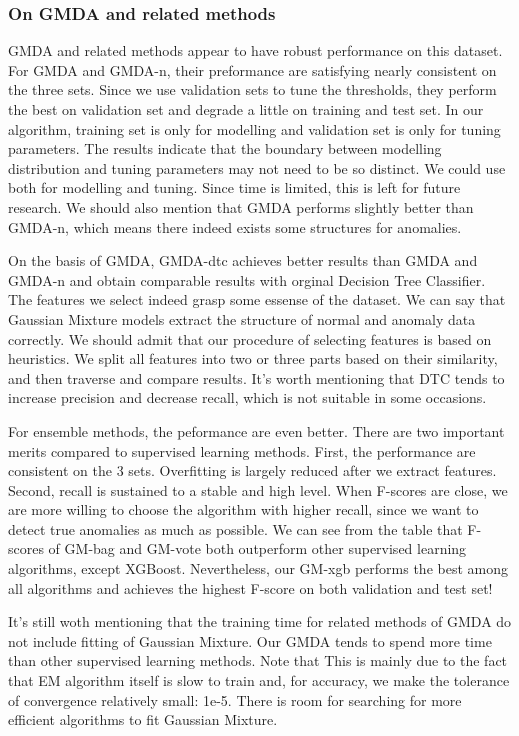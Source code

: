 \documentclass[english]{article}
\begin{document}
\subsubsection{On GMDA and related methods}
\par GMDA and related methods appear to have robust performance on this dataset. For GMDA and GMDA-n, their preformance are satisfying nearly consistent on the three sets. Since we use validation sets to tune the thresholds, they perform the best on validation set and degrade a little on training and test set. In our algorithm, training set is only for modelling and validation set is only for tuning parameters. The results indicate that the boundary between modelling distribution and tuning parameters may not need to be so distinct. We could use both for modelling and tuning. Since time is limited, this is left for future research. We should also mention that GMDA performs slightly better than GMDA-n, which means there indeed exists some structures for anomalies.
\par On the basis of GMDA, GMDA-dtc achieves better results than GMDA and GMDA-n and obtain comparable results with orginal Decision Tree Classifier. The features we select indeed grasp some essense of the dataset. We can say that Gaussian Mixture models extract the structure of normal and anomaly data correctly. We should admit that our procedure of selecting features is based on heuristics. We split all features into two or three parts based on their similarity, and then traverse and compare results. It's worth mentioning that DTC tends to increase precision and decrease recall, which is not suitable in some occasions. 
\par For ensemble methods, the peformance are even better. There are two important merits compared to supervised learning methods. First, the performance are consistent on the 3 sets. Overfitting is largely reduced after we extract features. Second, recall is sustained to a stable and high level. When F-scores are close, we are more willing to choose the algorithm with higher recall, since we want to detect true anomalies as much as possible. We can see from the table
that F-scores of GM-bag and GM-vote both outperform other supervised learning algorithms, except XGBoost. Nevertheless, our GM-xgb performs the best among all algorithms and achieves the highest F-score on both validation and test set!
\par It's still woth mentioning that the training time for related methods of GMDA do not include fitting of Gaussian Mixture. Our GMDA tends to spend more time than other supervised learning methods. Note that  This is mainly due to the fact that EM algorithm itself is slow to train and, for accuracy, we make the tolerance of convergence relatively small: 1e-5. There is room for searching for more efficient algorithms to fit Gaussian Mixture. 
\end{document}
